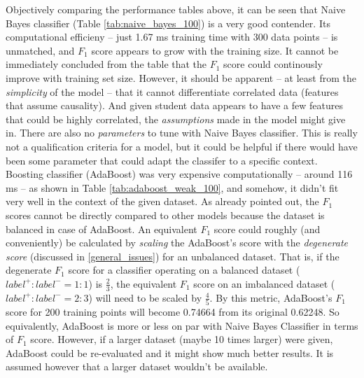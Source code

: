 \documentclass{article}
\begin{document}
	Objectively comparing the performance tables above, it can be seen that Naive Bayes classifier (Table \ref{tab:naive_bayes_100}) is a very good contender. Its computational efficieny -- just 1.67 ms training time with 300 data points -- is unmatched, and $F_1$ score appears to grow with the training size. It cannot be immediately concluded from the table that the $F_1$ score could continously improve with training set size. However, it should be apparent -- at least from the \emph{simplicity} of the model -- that it cannot differentiate correlated data (features that assume causality). And given student data appears to have a few features that could be highly correlated, the \emph{assumptions} made in the model might give in. There are also no \emph{parameters} to tune with Naive Bayes classifier. This is really not a qualification criteria for a model, but it could be helpful if there would have been some parameter that could adapt the classifer to a specific context. Boosting classifier (AdaBoost) was very expensive computationally -- around 116 ms -- as shown in Table \ref{tab:adaboost_weak_100}, and somehow, it didn't fit very well in the context of the given dataset. As already pointed out, the $F_1$ scores cannot be directly compared to other models because the dataset is balanced in case of AdaBoost. An equivalent $F_1$ score could roughly (and conveniently) be calculated by \emph{scaling} the AdaBoost's score with the \emph{degenerate score} (discussed in \ref{general_issues}) for an unbalanced dataset. That is, if the degenerate $F_1$ score for a classifier operating on a balanced dataset ($label^+:label^- = 1:1$) is $\frac{2}{3}$, the equivalent $F_1$ score on an imbalanced dataset ($label^+:label^- = 2:3$) will need to be scaled by $\frac{4}{5}$. By this metric, AdaBoost's $F_1$ score for 200 training points will become 0.74664 from its original 0.62248. So equivalently, AdaBoost is more or less on par with Naive Bayes Classifier in terms of $F_1$ score. However, if a larger dataset (maybe 10 times larger) were given, AdaBoost could be re-evaluated and it might show much better results. It is assumed however that a larger dataset wouldn't be available. 
	
\end{document}
